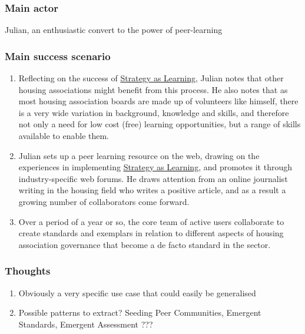 \subsubsection{Main actor}

Julian, an enthusiastic convert to the power of peer-learning

\subsubsection{Main success scenario}

\begin{enumerate}
\item
  Reflecting on the success of
  \href{http://socialmediaclassroom.com/host/peeragogy/forum/patterns-and-use-cases\#comment-1749}{Strategy
  as Learning}, Julian notes that other housing associations might
  benefit from this process. He also notes that as most housing
  association boards are made up of volunteers like himself, there is a
  very wide variation in background, knowledge and skills, and therefore
  not only a need for low cost (free) learning opportunities, but a
  range of skills available to enable them.
\item
  Julian sets up a peer learning resource on the web, drawing on the
  experiences in implementing
  \href{http://socialmediaclassroom.com/host/peeragogy/forum/patterns-and-use-cases\#comment-1749}{Strategy
  as Learning}, and promotes it through industry-specific web forums. He
  draws attention from an online journalist writing in the housing field
  who writes a positive article, and as a result a growing number of
  collaborators come forward.
\item
  Over a period of a year or so, the core team of active users
  collaborate to create standards and exemplars in relation to different
  aspects of housing association governance that become a de facto
  standard in the sector.
\end{enumerate}
\subsubsection{Thoughts}

\begin{enumerate}
\item
  Obviously a very specific use case that could easily be generalised
\item
  Possible patterns to extract? Seeding Peer Communities, Emergent
  Standards, Emergent Assessment ???
\end{enumerate}
